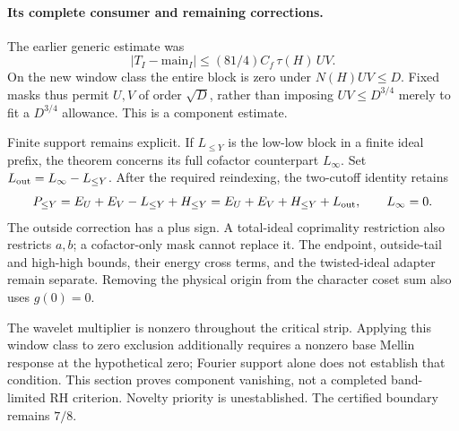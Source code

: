 \paragraph{Its complete consumer and remaining corrections.}
The earlier generic estimate was
\[
 |T_I-\mathrm{main}_I|
       \le (81/4)C_f\,\tau(H)\,UV.
\]
On the new window class the entire block is zero under
\(N(H)UV\le D\). Fixed masks thus permit \(U,V\) of order
\(\sqrt D\), rather than imposing \(UV\le D^{3/4}\) merely to
fit a \(D^{3/4}\) allowance. This is a component estimate.

Finite support remains explicit. If \(L_{\le Y}\) is the low-low
block in a finite ideal prefix, the theorem concerns its full
cofactor counterpart \(L_\infty\). Set
\(L_{\rm out}=L_\infty-L_{\le Y}\). After the required reindexing,
the two-cutoff identity retains
\[
 P_{\le Y}=E_U+E_V-L_{\le Y}+H_{\le Y}
          =E_U+E_V+H_{\le Y}+L_{\rm out},
 \qquad L_\infty=0.
\]
The outside correction has a plus sign. A total-ideal coprimality
restriction also restricts \(a,b\); a cofactor-only mask cannot
replace it. The endpoint, outside-tail and high-high bounds, their
energy cross terms, and the twisted-ideal adapter remain separate.
Removing the physical origin from the character coset sum also
uses \(g(0)=0\).

The wavelet multiplier is nonzero throughout the critical strip.
Applying this window class to zero exclusion additionally requires
a nonzero base Mellin response at the hypothetical zero; Fourier
support alone does not establish that condition. This section
proves component vanishing, not a completed band-limited RH
criterion. Novelty priority is unestablished. The certified
boundary remains \(7/8\).
